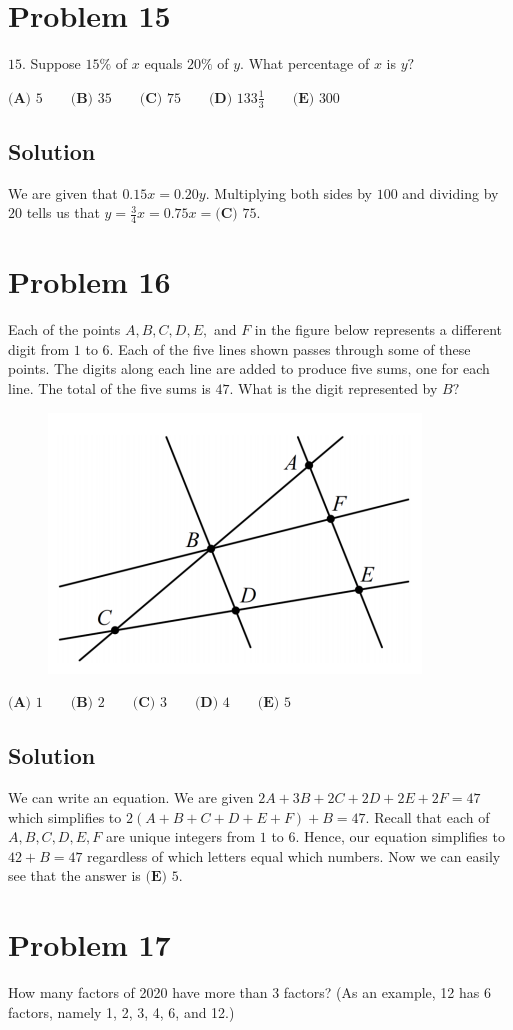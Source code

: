 \documentclass{article}
\begin{document}
\section{Problem 15}
$15.$ Suppose $15\%$ of $x$ equals $20\%$ of $y.$ What percentage of $x$ is $y?$

$\textbf{(A) }5 \qquad \textbf{(B) }35 \qquad \textbf{(C) }75 \qquad \textbf{(D) }133 \frac13 \qquad \textbf{(E) }300$
\subsection{Solution}
We are given that $0.15x=0.20y$. Multiplying both sides by $100$ and dividing by $20$ tells us that $y = \frac 34x =0.75x=\textbf{(C) }75$.
\section{Problem 16}
Each of the points $A,B,C,D,E,$ and $F$ in the figure below represents a different digit from $1$ to $6.$ Each of the five lines shown passes through some of these points. The digits along each line are added to produce five sums, one for each line. The total of the five sums is $47.$ What is the digit represented by $B?$
\begin{figure}[ht]
\centering
\includegraphics[width=.5\textwidth]{2020 AMC 8 Problem 16.png}
\end{figure}

$\textbf{(A) }1 \qquad \textbf{(B) }2 \qquad \textbf{(C) }3 \qquad \textbf{(D) }4 \qquad \textbf{(E) }5$
\subsection{Solution}
We can write an equation. We are given $2A+3B+2C+2D+2E+2F=47$ which simplifies to $2(A+B+C+D+E+F)+B=47$. Recall that each of $A,B,C,D,E,F$ are unique integers from $1$ to $6$. Hence, our equation simplifies to $42+B=47$ regardless of which letters equal which numbers. Now we can easily see that the answer is $\textbf{(E) }5$.
\section{Problem 17}
How many factors of 2020 have more than 3 factors? (As an example, 12 has 6 factors, namely 1, 2, 3, 4, 6, and 12.)
\end{document}
